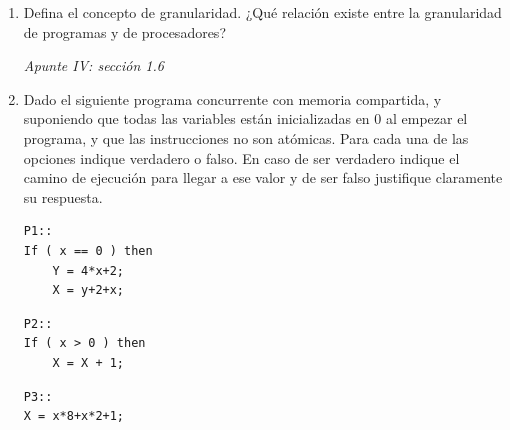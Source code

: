 \documentclass[a4paper, 10pt]{article}
\newenvironment{QandA}{
    \begin{enumerate}\bfseries}
    {\end{enumerate}
}
\newenvironment{answered}{\par\normalfont}{}
\begin{document}
\begin{QandA}

\item Defina el concepto de granularidad. ¿Qué relación existe entre la granularidad de programas y de procesadores?
\begin{answered}
    \emph{Apunte IV: sección 1.6}
\end{answered}


\item Dado el siguiente programa concurrente con memoria compartida, y suponiendo que todas las variables están inicializadas en 0 al empezar el programa, y que las instrucciones no son atómicas. Para cada una de las opciones indique verdadero o falso. En caso de ser verdadero indique el camino de ejecución para llegar a ese valor y de ser falso justifique claramente su respuesta.

\begin{multicols}{3}
\begin{lstlisting}
P1::            
If ( x == 0 ) then
    Y = 4*x+2;
    X = y+2+x;
\end{lstlisting}
\columnbreak
\begin{lstlisting}
P2::            
If ( x > 0 ) then
    X = X + 1;
\end{lstlisting}
\columnbreak
\begin{lstlisting}
P3::            
X = x*8+x*2+1;
\end{lstlisting}
\end{multicols}


\end{QandA}
\end{document}
